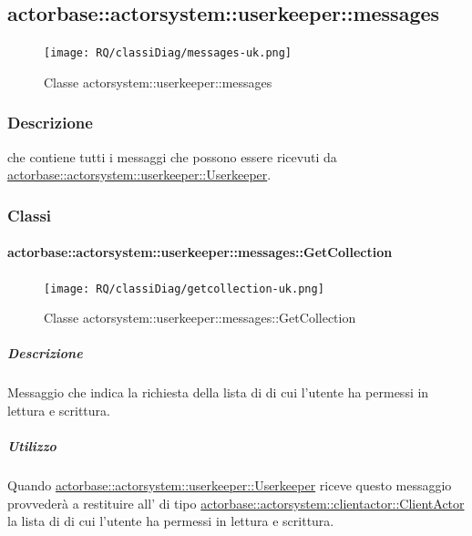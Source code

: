 \documentclass{scalatekids-article}
\begin{document}
\subsection{actorbase::actorsystem::userkeeper::messages}
\label{sec:actorbase::actorsystem::userkeeper::messages}

\begin{figure}[H]
  \begin{center}
    \texttt{[image: RQ/classiDiag/messages-uk.png]}
    \caption{Classe actorsystem::userkeeper::messages}
  \end{center}
\end{figure}

\subsubsection{Descrizione}

 che contiene tutti i messaggi che possono essere ricevuti da
\hyperref[sec:actorbase::actorsystem::userkeeper::Userkeeper]{actorbase::actorsystem::userkeeper::Userkeeper}.

\subsubsection{Classi}

\paragraph{actorbase::actorsystem::userkeeper::messages::GetCollection}
\label{sec:actorbase::actorsystem::userkeeper::messages::GetCollection}

\begin{figure}[H]
  \begin{center}
    \texttt{[image: RQ/classiDiag/getcollection-uk.png]}
    \caption{Classe actorsystem::userkeeper::messages::GetCollection}
  \end{center}
\end{figure}

\subparagraph{Descrizione}
Messaggio che indica la richiesta della lista di  di cui
l'utente ha permessi in lettura e scrittura.

\subparagraph{Utilizzo}
Quando \hyperref[sec:actorbase::actorsystem::userkeeper::Userkeeper]{actorbase::\allowbreak{}actorsystem::\allowbreak{}userkeeper::\allowbreak{}Userkeeper}
riceve questo messaggio provvederà a restituire all' di tipo
\hyperref[sec:actorbase::actorsystem::clientactor::ClientActor]{actorbase::\allowbreak{}actorsystem::\allowbreak{}clientactor::\allowbreak{}ClientActor}
la lista di  di cui l'utente ha permessi in lettura
e scrittura.
\end{document}

